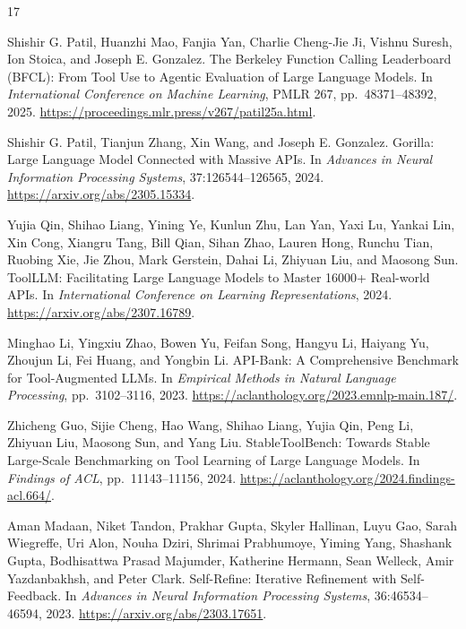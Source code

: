\documentclass[10pt,twocolumn,letterpaper]{article}
\begin{document}
\clearpage
\begin{thebibliography}{17}
\small

Shishir G. Patil, Huanzhi Mao, Fanjia Yan, Charlie Cheng-Jie Ji, Vishnu Suresh, Ion Stoica, and Joseph E. Gonzalez.
\newblock The Berkeley Function Calling Leaderboard (BFCL): From Tool Use to Agentic Evaluation of Large Language Models.
\newblock In \emph{International Conference on Machine Learning}, PMLR 267, pp.\ 48371--48392, 2025.
\newblock \url{https://proceedings.mlr.press/v267/patil25a.html}.

Shishir G. Patil, Tianjun Zhang, Xin Wang, and Joseph E. Gonzalez.
\newblock Gorilla: Large Language Model Connected with Massive APIs.
\newblock In \emph{Advances in Neural Information Processing Systems}, 37:126544--126565, 2024.
\newblock \url{https://arxiv.org/abs/2305.15334}.

Yujia Qin, Shihao Liang, Yining Ye, Kunlun Zhu, Lan Yan, Yaxi Lu, Yankai Lin, Xin Cong, Xiangru Tang, Bill Qian, Sihan Zhao, Lauren Hong, Runchu Tian, Ruobing Xie, Jie Zhou, Mark Gerstein, Dahai Li, Zhiyuan Liu, and Maosong Sun.
\newblock ToolLLM: Facilitating Large Language Models to Master 16000+ Real-world APIs.
\newblock In \emph{International Conference on Learning Representations}, 2024.
\newblock \url{https://arxiv.org/abs/2307.16789}.

Minghao Li, Yingxiu Zhao, Bowen Yu, Feifan Song, Hangyu Li, Haiyang Yu, Zhoujun Li, Fei Huang, and Yongbin Li.
\newblock API-Bank: A Comprehensive Benchmark for Tool-Augmented LLMs.
\newblock In \emph{Empirical Methods in Natural Language Processing}, pp.\ 3102--3116, 2023.
\newblock \url{https://aclanthology.org/2023.emnlp-main.187/}.

Zhicheng Guo, Sijie Cheng, Hao Wang, Shihao Liang, Yujia Qin, Peng Li, Zhiyuan Liu, Maosong Sun, and Yang Liu.
\newblock StableToolBench: Towards Stable Large-Scale Benchmarking on Tool Learning of Large Language Models.
\newblock In \emph{Findings of ACL}, pp.\ 11143--11156, 2024.
\newblock \url{https://aclanthology.org/2024.findings-acl.664/}.

Aman Madaan, Niket Tandon, Prakhar Gupta, Skyler Hallinan, Luyu Gao, Sarah Wiegreffe, Uri Alon, Nouha Dziri, Shrimai Prabhumoye, Yiming Yang, Shashank Gupta, Bodhisattwa Prasad Majumder, Katherine Hermann, Sean Welleck, Amir Yazdanbakhsh, and Peter Clark.
\newblock Self-Refine: Iterative Refinement with Self-Feedback.
\newblock In \emph{Advances in Neural Information Processing Systems}, 36:46534--46594, 2023.
\newblock \url{https://arxiv.org/abs/2303.17651}.


\end{thebibliography}
\end{document}

